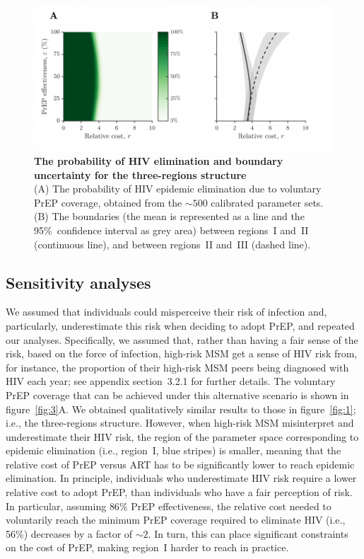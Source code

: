 \documentclass[preprint,review,12pt]{article}			%
\begin{document}
\begin{figure}[H]
	\centering
	\includegraphics{Figures/Fig_2}
	\caption{{\bf The probability of HIV elimination and boundary uncertainty for the three-regions structure}\\
	(A) The probability of HIV epidemic elimination due to voluntary PrEP coverage, obtained from the $\sim500$ calibrated parameter sets. (B) The boundaries (the mean is represented as a line and the 95\%~confidence interval as grey area) between regions~I and~II (continuous line), and between regions~II and~III (dashed line).}
	\label{fig:2}
\end{figure}


\subsection{Sensitivity analyses} 
\label{subsec:SensitivityAnalyses}

We assumed that individuals could misperceive their risk of infection and, particularly, underestimate this risk when deciding to adopt PrEP, and repeated our analyses. Specifically, we assumed that, rather than having a fair sense of the risk, based on the force of infection, high-risk MSM get a sense of HIV risk from, for instance, the proportion of their high-risk MSM peers being diagnosed with HIV each year; see appendix section~3.2.1 for further details. The voluntary PrEP coverage that can be achieved under this alternative scenario is shown in figure~\ref{fig:3}A. We obtained qualitatively similar results to those in figure~\ref{fig:1}; i.e., the three-regions structure. However, when high-risk MSM misinterpret and underestimate their HIV risk, the region of the parameter space corresponding to epidemic elimination (i.e., region~I, blue stripes) is smaller, meaning that the relative cost of PrEP versus ART has to be significantly lower to reach epidemic elimination. In principle, individuals who underestimate HIV risk require a lower relative cost to adopt PrEP, than individuals who have a fair perception of risk. In particular, assuming $86\%$ PrEP effectiveness, the relative cost needed to voluntarily reach the minimum PrEP coverage required to eliminate HIV (i.e., 56\%) decreases by a factor of $\sim2$. In turn, this can place significant constraints on the cost of PrEP, making region~I harder to reach in practice. 
\end{document}
